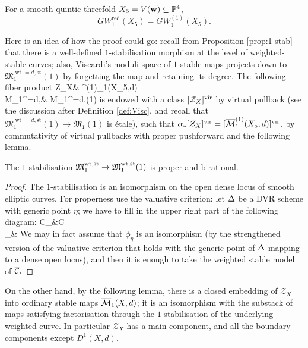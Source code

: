 \begin{thm}\cite{BCM}\label{thm:redvscusp}
 For a smooth quintic threefold $X_5=V(\mathbf w)\subseteq \PP^4$, \[GW_1^{\mathrm{red}}(X_5)=GW_1^{(1)}(X_5).\]
\end{thm}
Here is an idea of how the proof could go: recall from Proposition \ref{prop:1-stab} that there is a well-defined $1$-stabilisation morphism at the level of weighted-stable curves; also, Viscardi's moduli space of $1$-stable maps projects down to $\mathfrak M_{1}^{\operatorname{wt}=d,\text{st}}(1)$ by forgetting the map and retaining its degree. The following fiber product 
\bcd
\mathcal Z_X\ar[r,"\alpha"]\ar[d] & \oM^{(1)}_1(X_5,d)\ar[d] \\
\mathfrak M_{1}^{=d,}\ar[r] & \mathfrak M_{1}^{=d,}(1)
\ecd
is endowed with a class $\virt{\mathcal Z_X}$ by virtual pullback (see the discussion after Definition \ref{def:Visc}, and recall that $\mathfrak M_{1}^{\operatorname{wt}=d,\text{st}}(1)\to \mathfrak M_{1}(1)$ is \'etale), such that $\alpha_*\virt{\mathcal Z_X}=\virt{\oM^{(1)}_1(X_5,d)}$, by commutativity of virtual pullbacks with proper pushforward \cite[Theorem 4.3.1(3)(i)]{Manolache-Pull} and the following lemma.

\begin{lem}\label{lem:1stab}\cite[Lemma 4.19]{BCM}
 The $1$-stabilisation $\mathfrak{M}_1^{\rm{wt,st}}\to \mathfrak{M}_1^{\rm{wt,st}}(1)$ is proper and birational.
\end{lem}
\begin{proof}
The $1$-stabilisation is an isomorphism on the open dense locus of smooth elliptic curves. For properness use the valuative criterion: let $\dvr$ be a DVR scheme with generic point $\eta$; we have to fill in the upper right part of the following diagram:
\bcd
\mathcal C_{\eta}  &\mathcal C\\
\hC_{\eta}\ar[r, hookrightarrow] &\hC
\ecd
We may in fact assume that $\phi_{\eta}$ is an isomorphism (by the strengthened version of the valuative criterion that holds with the generic point of $\dvr$ mapping to a dense open locus), and then it is enough to take the weighted stable model of $\hC.$
\end{proof}
On the other hand, by the following lemma, there is a closed embedding of $\mathcal Z_X$ into ordinary stable maps $\oM_1(X,d)$; it is an isomorphism with the substack of maps satisfying factorisation through the $1$-stabilisation of the underlying weighted curve. In particular $\mathcal Z_X$ has a main component, and all the boundary components except $D^1(X,d)$.



